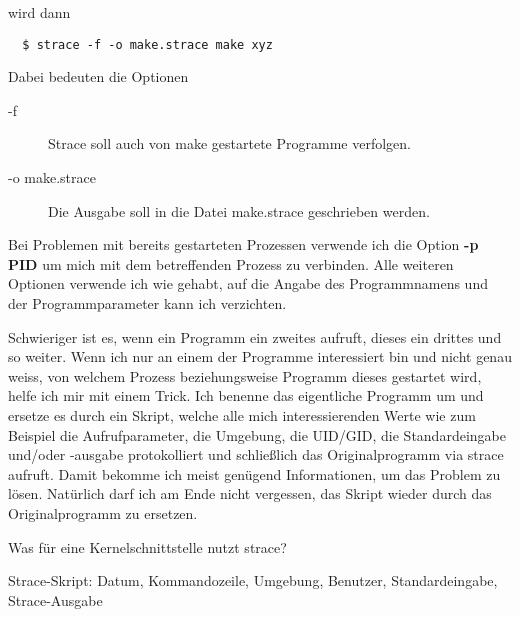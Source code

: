 \begin{normaltext}
  wird dann

  \begin{verbatim}
  $ strace -f -o make.strace make xyz
  \end{verbatim}

  Dabei bedeuten die Optionen

  \begin{description}
    \item[-f] Strace soll auch von make gestartete Programme verfolgen.
    \item[-o make.strace] Die Ausgabe soll in die Datei make.strace
      geschrieben werden.
  \end{description}

  Bei Problemen mit bereits gestarteten Prozessen verwende ich die Option
  {\bf -p PID} um mich mit dem betreffenden Prozess zu verbinden. Alle
  weiteren Optionen verwende ich wie gehabt, auf die Angabe des Programmnamens
  und der Programmparameter kann ich verzichten.

  Schwieriger ist es, wenn ein Programm ein zweites aufruft, dieses ein
  drittes und so weiter. Wenn ich nur an einem der Programme interessiert bin
  und nicht genau weiss, von welchem Prozess beziehungsweise Programm dieses
  gestartet wird, helfe ich mir mit einem Trick. Ich benenne das eigentliche
  Programm um und ersetze es durch ein Skript, welche alle mich
  interessierenden Werte wie zum Beispiel die Aufrufparameter, die Umgebung,
  die UID/GID, die Standardeingabe und/oder -ausgabe protokolliert und
  schließlich das Originalprogramm via strace aufruft.
  Damit bekomme ich meist genügend Informationen, um das Problem zu lösen.
  Natürlich darf ich am Ende nicht vergessen, das Skript wieder durch das
  Originalprogramm zu ersetzen.

  \begin{notes}
  \item Was für eine Kernelschnittstelle nutzt strace?
  \item Strace-Skript: Datum, Kommandozeile, Umgebung, Benutzer,
    Standardeingabe, Strace-Ausgabe
  \end{notes}
\end{normaltext}

